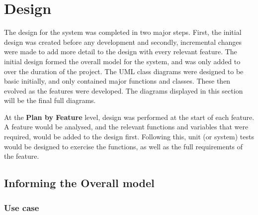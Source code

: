 \chapter{Design}
The design for the system was completed in two major steps. First, the initial design was created before any development and secondly, incremental changes were made to add more detail to the design with every relevant feature. The initial design formed the overall model for the system, and was only added to over the duration of the project. The UML class diagrams were designed to be basic initially, and only contained major functions and classes. These then evolved as the features were developed. The diagrams displayed in this section will be the final full diagrams.

At the \textbf{Plan by Feature} level, design was performed at the start of each feature. A feature would be analysed, and the relevant functions and variables that were required, would be added to the design first. Following this, unit (or system) tests would be designed to exercise the functions, as well as the full requirements of the feature.

\newpage

\section{Informing the Overall model}
\subsection{Use case}


